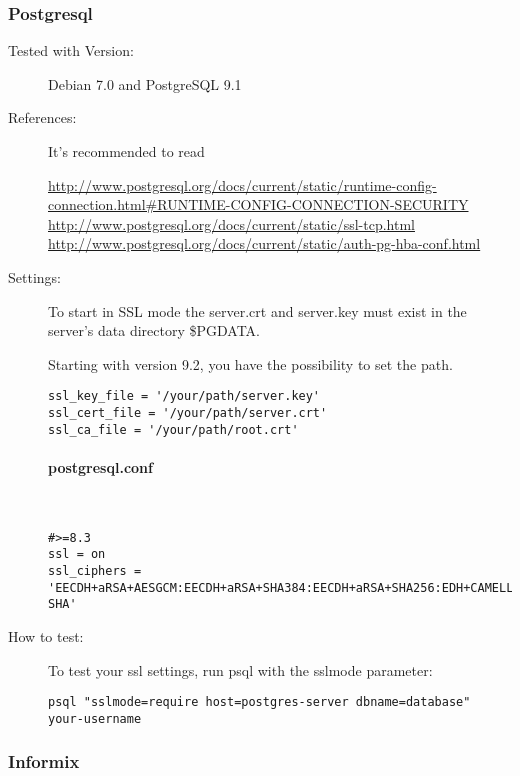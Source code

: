 % 







\subsubsection{Postgresql}

\begin{description}
\item[Tested with Version:] Debian 7.0 and PostgreSQL 9.1

\item[References:]

It's recommended to read 

{\small \url{http://www.postgresql.org/docs/current/static/runtime-config-connection.html#RUNTIME-CONFIG-CONNECTION-SECURITY}}
{\small \url{http://www.postgresql.org/docs/current/static/ssl-tcp.html}}
{\small \url{http://www.postgresql.org/docs/current/static/auth-pg-hba-conf.html}}

\item[Settings:] \mbox{}


To start in SSL mode the server.crt and server.key must exist in the server's data directory \$PGDATA. 

Starting with version 9.2, you have the possibility to set the path.

\begin{lstlisting}[breaklines]
ssl_key_file = '/your/path/server.key'
ssl_cert_file = '/your/path/server.crt'
ssl_ca_file = '/your/path/root.crt'
\end{lstlisting}

\paragraph*{postgresql.conf}\mbox{}\\

\begin{lstlisting}[breaklines]
#>=8.3
ssl = on 
ssl_ciphers = 'EECDH+aRSA+AESGCM:EECDH+aRSA+SHA384:EECDH+aRSA+SHA256:EDH+CAMELLIA256:EECDH:EDH+aRSA:+SSLv3:!aNULL:!eNULL:!LOW:!3DES:!MD5:!EXP:!PSK:!SRP:!DSS:!RC4:!SEED:!AES128:!CAMELLIA128:!ECDSA:AES256-SHA'
\end{lstlisting}



\item[How to test:]
To test your ssl settings, run psql with the sslmode parameter:
\begin{lstlisting}[breaklines]
psql "sslmode=require host=postgres-server dbname=database" your-username
\end{lstlisting}

\end{description}




\subsubsection{Informix}
